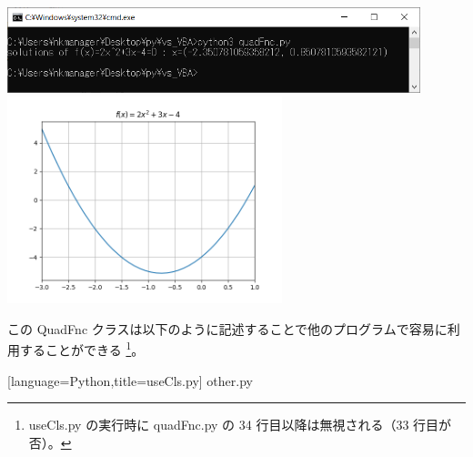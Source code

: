 \documentclass{jsarticle}
\begin{document}
\noindent\includegraphics[width=12cm]{img/cmd.png}\\
\noindent\includegraphics[width=8cm]{img/fig_py.png}

この QuadFnc クラスは以下のように記述することで他のプログラムで容易に利用することができる
\footnote{useCls.py の実行時に quadFnc.py の 34 行目以降は無視される（33 行目が否）。}。


	[language=Python,title=useCls.py]
	{other.py}
\end{document}
